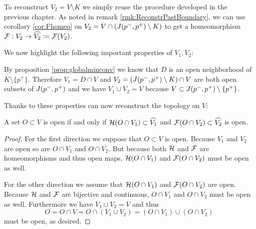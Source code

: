 \begin{remark}
    To reconstruct $V_2=V \setminus K$ we simply reuse the procedure developed in the previous chapter.
    As noted in remark \ref{rmk:ReconstrPastBoundary}, we can use corollary \ref{cor:Fhomeo} on $V_2=V\cap (J(p^-,p^+)\setminus K)$ to get a homeomorphism $\mathcal{F}:V_2\to \widehat{V_2}\coloneqq \mathcal{F}(V_2)$.
\end{remark}

We now highlight the following important properties of $V_1,V_2$:
\begin{remark}
    By proposition \ref{prop:globalminconv} we know that $D$ is an open neighborhood of $K\setminus \{p^+\}$. Therefore $V_1=D\cap V$ and $V_2=(J(p^-,p^+)\setminus K) \cap V$ are both open subsets of $J(p^-,p^+)$ and we have $V_1 \cup V_2 = V$ because $V\subset J(p^-,p^+) \setminus\{p^+\}$.
\end{remark}

Thanks to these properties can now reconstruct the topology on $V$:
\begin{lemma}
    A set $O\subset V$ is open if and only if ${\mathcal{H}}(O\cap V_1)\subset \widehat{V_1}$ and $\mathcal{F}(O\cap V_2)\subset \widehat{V_2}$ is open.
\end{lemma}
\begin{proof}
    For the first direction we suppose that $O\subset V$ is open. Because $V_1$ and $V_2$ are open so are $O\cap V_1$ and $O\cap V_2$. But because both ${\mathcal{H}}$ and $\mathcal{F}$ are homeomorphisms and thus open maps, ${\mathcal{H}}(O\cap V_1)$ and ${\mathcal{F}}(O\cap V_2)$ must be open as well.

    For the other direction we assume that ${\mathcal{H}}(O\cap V_1)$ and ${\mathcal{F}}(O\cap V_2)$ are open. Because ${\mathcal{H}}$ and ${\mathcal{F}}$ are bijective and continuous, $O\cap V_1$ and $O\cap V_2$ must be open as well. Furthermore we have $V_1\cup V_2 = V$ and thus 
    \[
        O = O\cap V = O \cap (V_1\cup V_2) = (O\cap V_1) \cup (O\cap V_2)
    \] must be open, as desired.
\end{proof}

